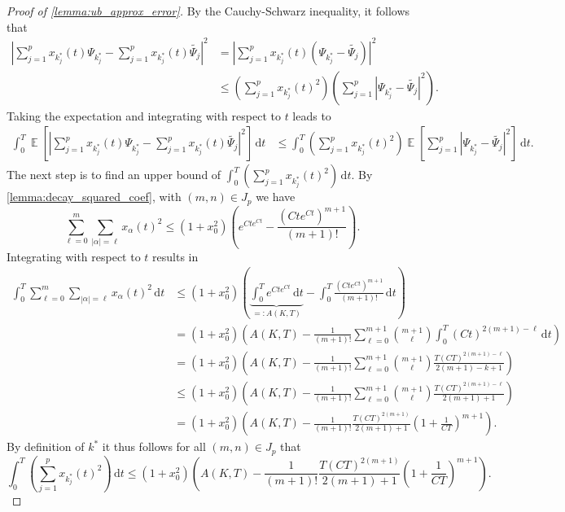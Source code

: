 \documentclass[10pt,a4paper]{amsart}
\DeclareMathOperator{\E}{\mathbb E}
\newcommand{\dd}{\ensuremath{\,\mathrm d}}
\begin{document}
\begin{proof}[Proof of \cref{lemma:ub_approx_error}]
    By the Cauchy-Schwarz inequality, it follows that
    \begin{align*}
        \left|\sum_{j=1}^p x_{k_j^*}(t)\Psi_{k_j^*} - \sum_{j=1}^p x_{k_j^*}(t)\widetilde{\Psi_j}\right|^2 &= \left|\sum_{j=1}^p x_{k_j^*}(t)(\Psi_{k_j^*}-\widetilde{\Psi_j})\right|^2\\
        &\leq \left(\sum_{j=1}^p x_{k_j^*}(t)^2\right)\left(\sum_{j=1}^p |\Psi_{k_j^*}-\widetilde{\Psi_j}|^2\right).
    \end{align*}
    Taking the expectation and integrating with respect to $t$ leads to
    \begin{align*}
        \int_0^T \E\left[\left|\sum_{j=1}^p x_{k_j^*}(t)\Psi_{k_j^*} - \sum_{j=1}^p x_{k_j^*}(t)\widetilde{\Psi_j}\right|^2\right]\dd t &\leq \int_0^T \left(\sum_{j=1}^p x_{k_j^*}(t)^2\right)\E\left[\sum_{j=1}^p |\Psi_{k_j^*}-\widetilde{\Psi_j}|^2\right]\dd t.
    \end{align*}
    The next step is to find an upper bound of $\int_0^T \left(\sum_{j=1}^p x_{k_j^*}(t)^2\right) \dd t$.
    By \cref{lemma:decay_squared_coef}, with $(m,n) \in J_p$ we have
    \begin{equation*}
        \sum_{\ell = 0}^m \sum_{|\alpha|=\ell} x_\alpha(t)^2 \leq (1+x_0^2)\left(e^{Ct e^{Ct}} - \frac{(Cte^{Ct})^{m+1}}{(m+1)!}\right).
    \end{equation*}
    Integrating with respect to $t$ results in
    \begin{align*}
        \int_0^T \sum_{\ell=0}^m\sum_{|\alpha|=\ell}x_\alpha(t)^2 \dd t &\leq (1+x_0^2)\left(\underbrace{\int_0^T e^{Cte^{Ct}} \dd t}_{=: A(K,T)} - \int_0^T \frac{(Cte^{Ct})^{m+1}}{(m+1)!}\dd t\right)\\
        &= (1+x_0^2)\left(A(K,T) - \frac{1}{(m+1)!}\sum_{\ell=0}^{m+1}\binom{m+1}{\ell}\int_0^T (Ct)^{2(m+1)-\ell}\dd t\right)\\
        &= (1+x_0^2)\left(A(K,T) - \frac{1}{(m+1)!}\sum_{\ell=0}^{m+1}\binom{m+1}{\ell}\frac{T(CT)^{2(m+1)-\ell}}{2(m+1)-k+1}\right)\\
        &\leq (1+x_0^2)\left(A(K,T) - \frac{1}{(m+1)!}\sum_{\ell=0}^{m+1}\binom{m+1}{\ell}\frac{T(CT)^{2(m+1)-\ell}}{2(m+1)+1}\right)\\
        &= (1+x_0^2)\left(A(K,T) - \frac{1}{(m+1)!}\frac{T(CT)^{2(m+1)}}{2(m+1)+1}\left(1+\frac{1}{CT}\right)^{m+1}\right).
    \end{align*}
    By definition of $k^*$ it thus follows for all $(m,n) \in J_p$ that
    \begin{equation*}
        \int_0^T \left(\sum_{j=1}^p x_{k_j^*}(t)^2\right) \dd t \leq (1+x_0^2)\left(A(K,T) - \frac{1}{(m+1)!}\frac{T(CT)^{2(m+1)}}{2(m+1)+1}\left(1+\frac{1}{CT}\right)^{m+1}\right).
    \end{equation*}


\end{proof}
\end{document}
